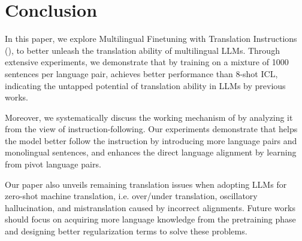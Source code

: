 \section{Conclusion}
In this paper, we explore Multilingual Finetuning with Translation Instructions (\methodend), to better unleash the translation ability of multilingual LLMs. Through extensive experiments, we demonstrate that by training on a mixture of 1000 sentences per language pair, \method achieves better performance than 8-shot ICL, indicating the untapped potential of translation ability in LLMs by previous works. 

Moreover, we systematically discuss the working mechanism of \method by analyzing it from the view of instruction-following. Our experiments demonstrate that \method helps the model better follow the instruction by introducing more language pairs and monolingual sentences, and enhances the direct language alignment by learning from pivot language pairs. 

Our paper also unveils remaining translation issues when adopting LLMs for zero-shot machine translation, i.e. over/under translation, oscillatory hallucination, and mistranslation caused by incorrect alignments. Future works should focus on acquiring more language knowledge from the pretraining phase and designing better regularization terms to solve these problems.